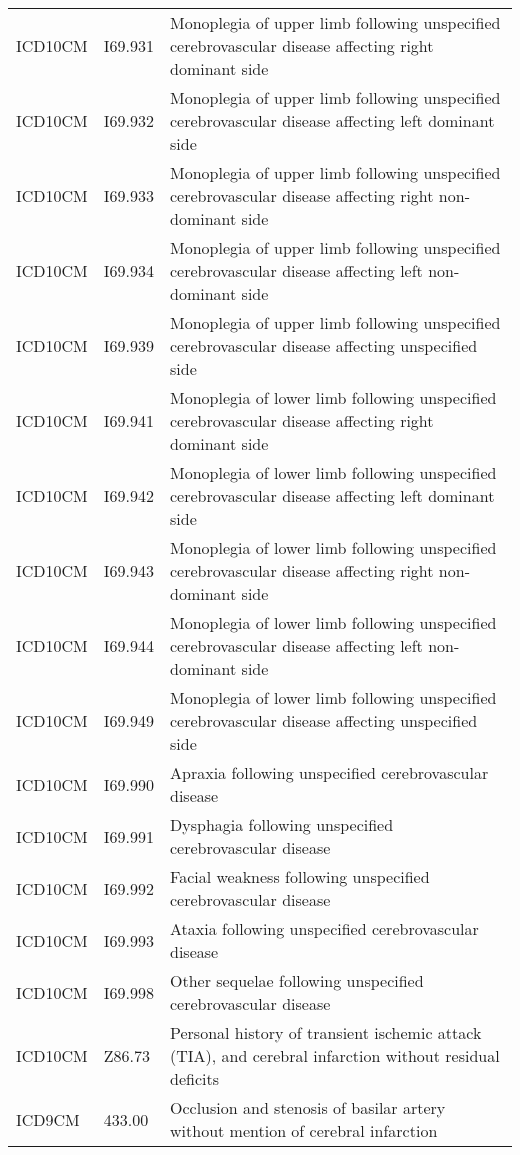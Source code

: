 \begin{longtable}{p{}p{}p{}}
  ICD10CM & I69.931 & Monoplegia of upper limb following unspecified cerebrovascular disease affecting right dominant side \\ 
  ICD10CM & I69.932 & Monoplegia of upper limb following unspecified cerebrovascular disease affecting left dominant side \\ 
  ICD10CM & I69.933 & Monoplegia of upper limb following unspecified cerebrovascular disease affecting right non-dominant side \\ 
  ICD10CM & I69.934 & Monoplegia of upper limb following unspecified cerebrovascular disease affecting left non-dominant side \\ 
  ICD10CM & I69.939 & Monoplegia of upper limb following unspecified cerebrovascular disease affecting unspecified side \\ 
  ICD10CM & I69.941 & Monoplegia of lower limb following unspecified cerebrovascular disease affecting right dominant side \\ 
  ICD10CM & I69.942 & Monoplegia of lower limb following unspecified cerebrovascular disease affecting left dominant side \\ 
  ICD10CM & I69.943 & Monoplegia of lower limb following unspecified cerebrovascular disease affecting right non-dominant side \\ 
  ICD10CM & I69.944 & Monoplegia of lower limb following unspecified cerebrovascular disease affecting left non-dominant side \\ 
  ICD10CM & I69.949 & Monoplegia of lower limb following unspecified cerebrovascular disease affecting unspecified side \\ 
  ICD10CM & I69.990 & Apraxia following unspecified cerebrovascular disease \\ 
  ICD10CM & I69.991 & Dysphagia following unspecified cerebrovascular disease \\ 
  ICD10CM & I69.992 & Facial weakness following unspecified cerebrovascular disease \\ 
  ICD10CM & I69.993 & Ataxia following unspecified cerebrovascular disease \\ 
  ICD10CM & I69.998 & Other sequelae following unspecified cerebrovascular disease \\ 
  ICD10CM & Z86.73 & Personal history of transient ischemic attack (TIA), and cerebral infarction without residual deficits \\ 
  ICD9CM & 433.00 & Occlusion and stenosis of basilar artery without mention of cerebral infarction \\ 

\end{longtable}
